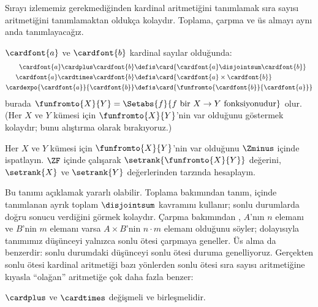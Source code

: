 


Sırayı izlememiz gerekmediğinden kardinal aritmetiğini tanımlamak sıra
sayısı aritmetiğini tanımlamaktan oldukça kolaydır. Toplama, çarpma ve
üs almayı aynı anda tanımlayacağız.

\begin{defn}
$\cardfont{a}$ ve $\cardfont{b}$ kardinal sayılar olduğunda:
\begin{align*}
	\cardfont{a} \cardplus \cardfont{b} &\defis
	\card{\cardfont{a} \disjointsum \cardfont{b}}\\
	\cardfont{a} \cardtimes \cardfont{b} &\defis
	\card{\cardfont{a} \times \cardfont{b}}\\
	\cardexpo{\cardfont{a}}{\cardfont{b}} &\defis
	\card{\funfromto{\cardfont{b}}{\cardfont{a}}}
\end{align*}
burada $\funfromto{X}{Y} = \Setabs{f}{f \text{ bir } X \to Y
\text{ fonksiyonudur}}$ olur. (Her $X$ ve $Y$ kümesi için
$\funfromto{X}{Y}$'nin var olduğunu göstermek kolaydır; bunu alıştırma
olarak bırakıyoruz.)
\end{defn}

\begin{prob}
Her $X$ ve $Y$ kümesi için $\funfromto{X}{Y}$'nin var olduğunu $\Zminus$
içinde ispatlayın. $\ZF$ içinde çalışarak
$\setrank{\funfromto{X}{Y}}$ değerini, $\setrank{X}$ ve $\setrank{Y}$
değerlerinden
 tarzında
hesaplayın.
\end{prob}

Bu tanımı açıklamak yararlı olabilir. Toplama bakımından tanım,
 içinde tanımlanan ayrık toplam
$\disjointsum$ kavramını kullanır; sonlu durumlarda doğru sonucu verdiğini
görmek kolaydır. Çarpma bakımından
, $A$'nın $n$ elemanı ve $B$'nin $m$
elemanı varsa $A\times B$'nin $n\cdot m$ elemanı olduğunu söyler;
dolayısıyla tanımımız düşünceyi yalnızca sonlu ötesi çarpmaya geneller.
Üs alma da benzerdir: sonlu durumdaki düşünceyi sonlu ötesi duruma
genelliyoruz. Gerçekten sonlu ötesi kardinal aritmetiği bazı yönlerden
sonlu ötesi sıra sayısı aritmetiğine kıyasla ``olağan'' aritmetiğe çok
daha fazla benzer:

\begin{prop}
$\cardplus$ ve $\cardtimes$ değişmeli ve birleşmelidir.
\end{prop}

